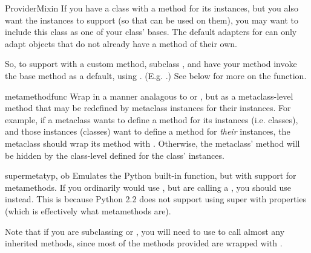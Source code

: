 \begin{verbatim%
}
\begin{verbatim%
}
\begin{verbatim%
}
\begin{verbatim%
}
\begin{verbatim%
}
\begin{verbatim%
}
\begin{classdesc*}{ProviderMixin}
If you have a class with a  method for its instances, but
you also want the instances to support  (so that
 can be used on them), you may want to include this
class as one of your class' bases.  The default adapters for
 can only adapt objects that do not already have a
 method of their own.

So, to support  with a custom 
method, subclass , and have your 
method invoke the base  method as a default, using
.  (E.g. .)  See below for more on
the  function.
\end{classdesc*}








\begin{funcdesc}{metamethod}{func}
Wrap  in a manner analagous to  or
, but as a metaclass-level method that may be redefined
by metaclass instances for their instances.  For example, if a metaclass wants
to define a  method for its instances (i.e. classes), and
those instances (classes) want to define a  method for
\emph{their} instances, the metaclass should wrap its 
method with .  Otherwise, the metaclass'
 method will be hidden by the class-level
 defined for the class' instances.
\end{funcdesc}

\begin{funcdesc}{supermeta}{typ, ob}
Emulates the Python built-in  function, but with support for
metamethods.  If you ordinarily would use , but are calling a
, you should use  instead.  This is
because Python 2.2 does not support using super with properties (which is
effectively what metamethods are).

Note that if you are subclassing  or , you
will need to use  to call almost any inherited methods,
since most of the methods provided are wrapped with .
\end{funcdesc}


\end{verbatim%
}
\end{verbatim%
}
\end{verbatim%
}
\end{verbatim%
}
\end{verbatim%
}
\end{verbatim%
}
